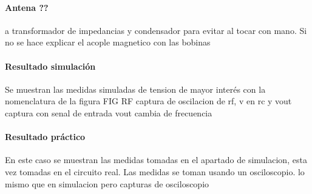 \paragraph{Antena ??} 
a transformador de impedancias  y condensador para evitar al tocar con mano. Si no se hace explicar el acople magnetico con las bobinas

\paragraph{Resultado simulaci\'on} Se muestran las medidas simuladas de tension de mayor inter\'es con la nomenclatura de la figura FIG RF
captura de oscilacion de rf, v en rc y vout
captura con senal de entrada vout cambia de frecuencia

\paragraph{Resultado práctico} En este caso se muestran las medidas tomadas en el apartado de simulacion, esta vez tomadas en el circuito real. Las medidas se toman usando un osciloscopio. 
lo mismo que en simulacion pero capturas de osciloscopio
